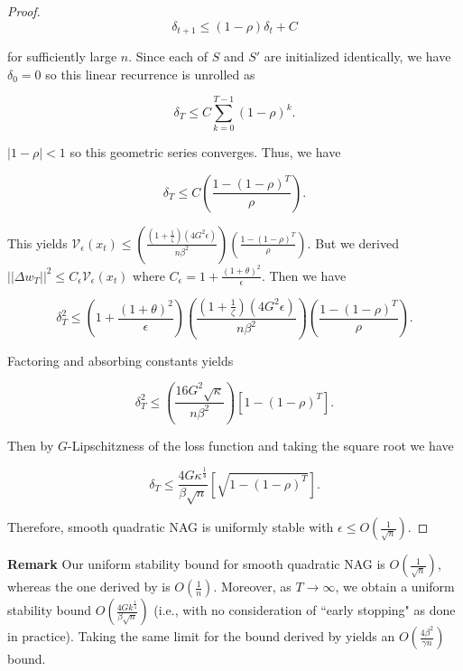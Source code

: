 \documentclass[twoside,11pt]{article}
\begin{document}
\begin{proof}
\begin{equation}
\delta_{t+1} \leq (1-\rho)\delta_t + C
\end{equation}

\noindent
for sufficiently large $n$. Since each of $S$ and $S'$ are initialized identically, we have $\delta_0 = 0$ so this linear recurrence is unrolled as

\begin{equation}
\delta_T \leq C\sum_{k=0}^{T-1}(1-\rho)^k.
\end{equation}

\noindent
$|1-\rho| < 1$ so this geometric series converges. Thus, we have

\begin{equation}
\delta_T \leq C(\frac{1-(1-\rho)^T}{\rho}).
\end{equation}

\noindent
This yields $\mathcal{V}_{\epsilon}(x_t) \leq (\frac{(1+\frac{1}{\zeta})(4G^2\epsilon)}{n\beta^2})(\frac{1-(1-\rho)^T}{\rho})$. But we derived $||\Delta w_T||^2 \leq C_{\epsilon}\mathcal{V}_{\epsilon}(x_t)$ where $C_{\epsilon} = 1 + \frac{(1+\theta)^2}{\epsilon}$. Then we have

\begin{equation}
\delta_T^2 \leq (1 + \frac{(1+\theta)^2}{\epsilon})(\frac{(1+\frac{1}{\zeta})(4G^2\epsilon)}{n\beta^2})(\frac{1-(1-\rho)^T}{\rho}).
\end{equation}

\noindent
Factoring and absorbing constants yields

\begin{equation}
\delta_T^2 \leq (\frac{16G^2\sqrt{\kappa}}{n \beta^2})[1-(1-\rho)^T].
\end{equation}

\noindent
Then by $G$-Lipschitzness of the loss function and taking the square root we have

\begin{equation}
\delta_T \leq \frac{4G\kappa^{\frac{1}{4}}}{\beta \sqrt{n}}[\sqrt{1-(1-\rho)^T}].
\end{equation}

\noindent
Therefore, smooth quadratic NAG is uniformly stable with $\epsilon \leq O(\frac{1}{\sqrt{n}})$.
\end{proof}

\noindent
\textbf{Remark} Our uniform stability bound for smooth quadratic NAG is $O(\frac{1}{\sqrt{n}})$, whereas the one derived by \cite{CJY18} is $O(\frac{1}{n})$. Moreover, as $T \rightarrow \infty$, we obtain a uniform stability bound $O(\frac{4Gk^{\frac{1}{4}}}{\beta \sqrt{n}})$ (i.e., with no consideration of ``early stopping" as done in practice). Taking the same limit for the bound derived by \cite{CJY18} yields an $O(\frac{4\beta^2}{\gamma n})$ bound.
\end{document}
